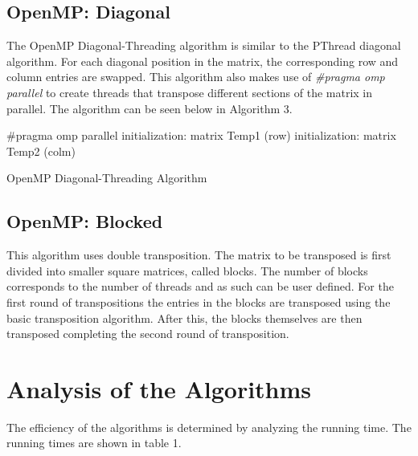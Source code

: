 \documentclass[twocolumn, 11pt]{IEEEtran}
\begin{document}
\subsection{OpenMP: Diagonal}

The OpenMP Diagonal-Threading algorithm is similar to the PThread diagonal algorithm. For each diagonal position in the matrix, the corresponding row and column entries are swapped. This algorithm also makes use of \textit{\#pragma omp parallel} to create threads that transpose different sections of the matrix in parallel. The algorithm can be seen below in Algorithm 3. 

\begin{algorithm}
\SetAlgoLined
     \#pragma omp parallel\;
     initialization: matrix Temp1 (row)\;
     initialization: matrix Temp2 (colm)\;
     \caption{OpenMP Diagonal-Threading Algorithm}
\end{algorithm}


\subsection{OpenMP: Blocked}

This algorithm uses double transposition. The matrix to be transposed is first divided into smaller square matrices, called blocks. The number of blocks corresponds to the number of threads and as such can be user defined. For the first round of transpositions the entries in the blocks are transposed using the basic transposition algorithm. After this, the blocks themselves are then transposed completing the second round of transposition.

\section{Analysis of the Algorithms}

The efficiency of the algorithms is determined by analyzing the running time. The running times are shown in table 1.
\end{document}
